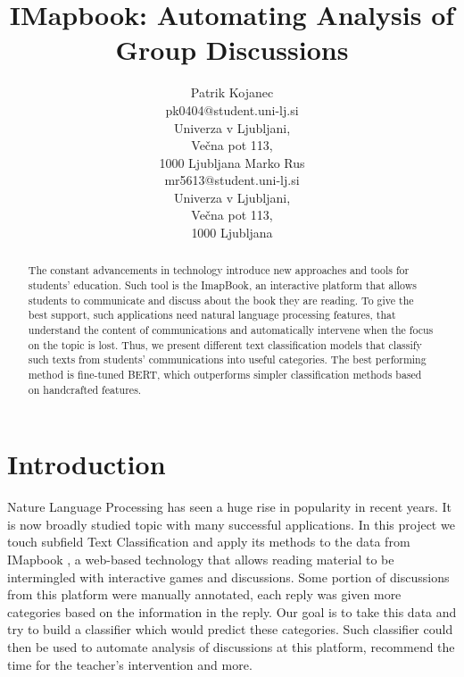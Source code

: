 \documentclass[11pt,a4paper]{article}
\title{IMapbook: Automating Analysis of Group Discussions}
\author{ \and }
\author{Patrik Kojanec \\ pk0404@student.uni-lj.si  \\ Univerza v Ljubljani,\\ Ve\v cna pot 113,\\ 1000 Ljubljana
        \And
        Marko Rus \\ mr5613@student.uni-lj.si\\ Univerza v Ljubljani,\\ Ve\v cna pot 113,\\ 1000 Ljubljana}
\date{}
\begin{document}
\maketitle

\begin{abstract} 
The constant advancements in technology introduce new approaches and tools for students' education. Such tool is the ImapBook, an interactive platform that allows students to communicate and discuss about the book they are reading. To give the best support, such applications need natural language processing features, that understand the content of communications and automatically intervene when the focus on the topic is lost. Thus, we present different text classification models that classify such texts from students' communications into useful categories. The best performing method is fine-tuned BERT, which outperforms simpler classification methods based on handcrafted features.
\end{abstract}

\section{Introduction}
Nature Language Processing has seen a huge rise in popularity in recent years. It is now broadly studied topic with many successful applications. In this project we touch subfield Text Classification and apply its methods to the data from IMapbook \cite{imapbook}, a web-based technology that allows reading material to be intermingled with interactive games and discussions. Some portion of discussions from this platform were manually annotated, each reply was given more categories based on the information in the reply. Our goal is to  take this data and try to build a classifier which would predict these categories. Such classifier could then be used to automate analysis of discussions at this platform, recommend the time for the teacher’s intervention and more.
\end{document}
